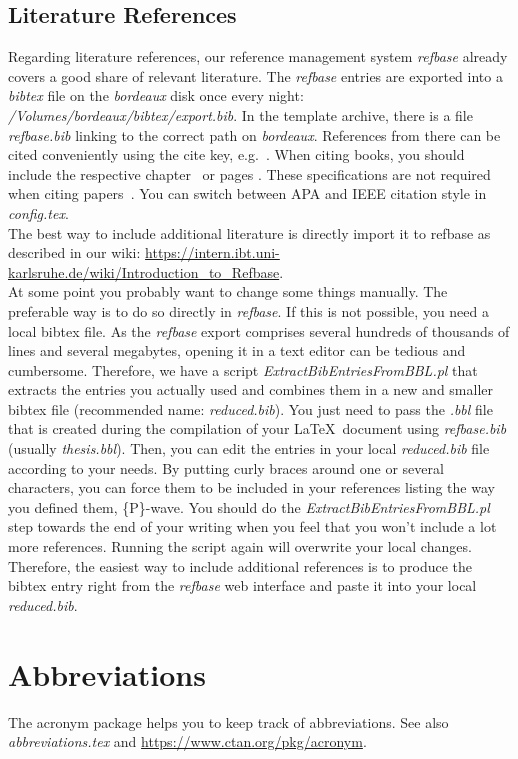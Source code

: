 \subsection{Literature References}
\label{sec:meth:references:literature}
Regarding literature references, our reference management system \textit{refbase} already covers a good share of relevant literature. The \textit{refbase} entries are exported into a \textit{bibtex} file on the \textit{bordeaux} disk once every night: \textit{/Volumes/bordeaux/bibtex/export.bib}. In the template archive, there is a file \textit{refbase.bib} linking to the correct path on \textit{bordeaux}. References from there can be cited conveniently using the cite key, e.g.~\cite{courtemanche98}. When citing books, you should include the respective chapter~\cite[Chap. 5]{belytschko00} or pages  \cite[pp. 239--240]{belytschko00}. These specifications are not required when citing papers~\cite{riedel02}. You can switch between APA and IEEE citation style in \textit{config.tex}.\\
The best way to include additional literature is directly import it to refbase as described in our wiki: \url{https://intern.ibt.uni-karlsruhe.de/wiki/Introduction_to_Refbase}.\\
At some point you probably want to change some things manually. The preferable way is to do so directly in \textit{refbase}. If this is not possible, you need a local bibtex file. As the \textit{refbase} export comprises several hundreds of thousands of lines and several megabytes, opening it in a text editor can be tedious and cumbersome. Therefore, we have a script \textit{ExtractBibEntriesFromBBL.pl} that extracts the entries you actually used and combines them in a new and smaller bibtex file (recommended name: \textit{reduced.bib}). You just need to pass the \textit{.bbl} file that is created during the compilation of your \LaTeX\ document using \textit{refbase.bib} (usually \textit{thesis.bbl}). Then, you can edit the entries in your local \textit{reduced.bib} file according to your needs. By putting curly braces around one or several characters, you can force them to be included in your references listing the way you defined them, \eg \{P\}-wave. You should do the \textit{ExtractBibEntriesFromBBL.pl} step towards the end of your writing when you feel that you won't include a lot more references. Running the script again will overwrite your local changes. Therefore, the easiest way to include additional references is to produce the bibtex entry right from the \textit{refbase} web interface and paste it into your local \textit{reduced.bib}.

\section{Abbreviations}
The acronym package helps you to keep track of abbreviations. See also \textit{abbreviations.tex} and \url{https://www.ctan.org/pkg/acronym}.
\cite{EKGO}
